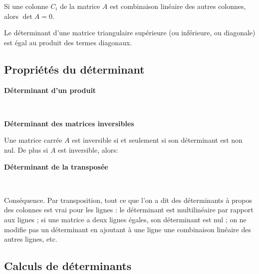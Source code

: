 \documentclass[10pt,class=article,crop=false]{standalone}
\begin{document}
\begin{multicols}{2}
\begin{corollaire} \label{coro:colonnes-liees}
Si une colonne $C_i$ de la matrice $A$ est combinaison linéaire des autres colonnes, alors $\det A=0$.
\end{corollaire}


\begin{proposition}
	\label{prop:dettriang}
	Le déterminant d'une matrice triangulaire supérieure (ou inférieure, ou diagonale)
	est égal au produit des termes diagonaux.
\end{proposition}


\subsection{Propriétés du déterminant}




\textbf{Déterminant d'un produit}


\begin{theoreme}~
\end{theoreme}


\textbf{Déterminant des matrices inversibles}

\begin{corollaire}
	Une matrice carrée $A$ est inversible si et seulement si son
	déterminant est non nul. De plus si $A$ est inversible,
	alors:
\end{corollaire}



\textbf{Déterminant de la transposée}

\begin{corollaire}
	~
\end{corollaire}

Conséquence. Par transposition, tout ce que l'on a
dit des déterminants à propos des colonnes est
vrai pour les lignes : le déterminant est multilinéaire
par rapport aux lignes ; si une matrice a deux lignes égales,
son déterminant est nul ; on ne modifie pas un déterminant en
ajoutant à une ligne une combinaison linéaire des autres lignes, etc.
	


\subsection{Calculs de déterminants}



\end{multicols}
\end{document}
